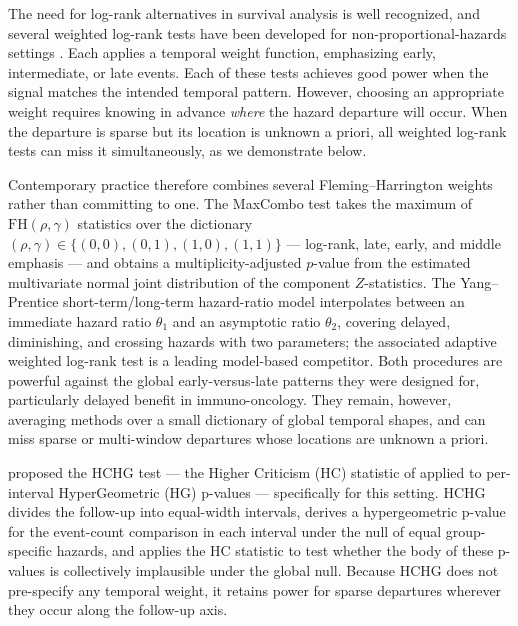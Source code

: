 \documentclass[11pt]{article}
\begin{document}
The need for log-rank alternatives in survival analysis is well recognized,
and several weighted log-rank tests have been developed for non-proportional-hazards
settings \citep{gehan1965,peto1972,taroneware1977,harrington1982,flemingharrington1991}.
Each applies a temporal weight function, emphasizing early, intermediate,
or late events. Each of these tests achieves good power when the signal matches the intended temporal pattern. However, choosing an appropriate weight requires knowing in advance \emph{where} the hazard departure will occur. When the departure is sparse but its location is unknown a priori, all weighted log-rank tests can miss it simultaneously, as we demonstrate below.

Contemporary practice therefore combines several Fleming--Harrington weights rather than committing to one. The MaxCombo test \citep{lin2020maxcombo,ristl2021nph} takes the maximum of $\mathrm{FH}(\rho,\gamma)$ statistics over the dictionary $(\rho,\gamma)\in\{(0,0),(0,1),(1,0),(1,1)\}$ --- log-rank, late, early, and middle emphasis --- and obtains a multiplicity-adjusted $p$-value from the estimated multivariate normal joint distribution of the component $Z$-statistics. The Yang--Prentice short-term/long-term hazard-ratio model \citep{yang2005} interpolates between an immediate hazard ratio $\theta_1$ and an asymptotic ratio $\theta_2$, covering delayed, diminishing, and crossing hazards with two parameters; the associated adaptive weighted log-rank test \citep{yang2010improved} is a leading model-based competitor. Both procedures are powerful against the global early-versus-late patterns they were designed for, particularly delayed benefit in immuno-oncology. They remain, however, averaging methods over a small dictionary of global temporal shapes, and can miss sparse or multi-window departures whose locations are unknown a priori.

\citet{kipnis_biometrika} proposed the HCHG test — the Higher Criticism
(HC) statistic of \citet{donoho2004} applied to per-interval
HyperGeometric (HG) p-values — specifically for this setting. HCHG
divides the follow-up into equal-width intervals, derives a hypergeometric
p-value for the event-count comparison in each interval under the null of
equal group-specific hazards, and applies the HC statistic to test whether
the body of these p-values is collectively implausible
under the global null. Because HCHG does not pre-specify any temporal
weight, it retains power for sparse departures wherever they occur along
the follow-up axis.
\end{document}
